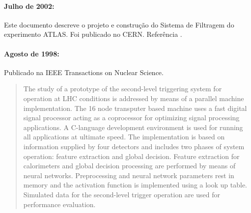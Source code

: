 \paragraph{Julho de 2002: } Este documento descreve o projeto e
construção do Sistema de Filtragem do experimento ATLAS. Foi publicado no
CERN. Referência \cite{hlt-tdr}.

\paragraph{Agosto de 1998: } Publicado na IEEE Transactions on Nuclear Science. 

\begin{quotation}
The study of a prototype of the second-level triggering system for operation
at LHC conditions is addressed by means of a parallel machine
implementation. The 16 node transputer based machine uses a fast digital
signal processor acting as a coprocessor for optimizing signal processing
applications. A C-language development environment is used for running all
applications at ultimate speed. The implementation is based on information
supplied by four detectors and includes two phases of system operation:
feature extraction and global decision. Feature extraction for calorimeters
and global decision processing are performed by means of neural
networks. Preprocessing and neural network parameters rest in memory and the
activation function is implemented using a look up table. Simulated data for
the second-level trigger operation are used for performance evaluation.
\end{quotation}

